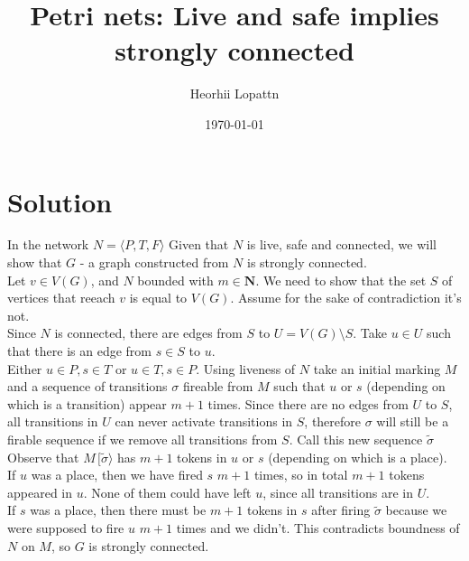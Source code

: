 \documentclass[12pt]{article}
\title{Petri nets: Live and safe implies strongly connected}
\author{Heorhii Lopattn}
\date{\today}
\begin{document}
\newcommand{\fire}[1]{\xrightarrow{#1}}
\newcommand{\fireb}[1]{\xleftarrow{#1}}

\newcommand{\firee}[1]{\,[#1\rangle}

\maketitle

\section*{Solution}
In the network $N = \langle P, T, F \rangle$ Given that $N$ is live, safe and connected, we will show that $G$ - a graph constructed from $N$ is strongly connected. \\
Let $v \in V(G)$, and $N$ bounded with $m \in \mathbf{N}$. We need to show that the set $S$ of vertices that reeach $v$ is equal to $V(G)$. Assume for the sake of contradiction it's not. \\ 
Since $N$ is connected, there are edges from $S$ to $U=V(G)\setminus S$. Take $u \in U$ such that there is an edge from $s \in S$ to $u$. \\
Either $u \in P, s \in T$ or $u \in T, s \in P$. Using liveness of $N$ take an initial marking $M$ and a sequence of transitions $\sigma$ fireable from $M$ such that $u$ or $s$ (depending on which is a transition) appear $m+1$ times. 
Since there are no edges from $U$ to $S$, all transitions in $U$ can never activate transitions in $S$, therefore $\sigma$ will still be a firable sequence if we remove all transitions from $S$. Call this new sequence $\tilde \sigma$ \\ 
Observe that $M \firee {\tilde \sigma} $ has $m+1$ tokens in $u$ or $s$ (depending on which is a place).\\
If $u$ was a place, then we have fired $s$ $m+1$ times, so in total $m+1$ tokens appeared in $u$. None of them could have left $u$, since all transitions are in $U$.\\
If $s$ was a place, then there must be $m+1$ tokens in $s$ after firing $\tilde \sigma$ because we were supposed to fire $u$ $m+1$ times and we didn't.
This contradicts boundness of $N$ on $M$, so $G$ is strongly connected.
\end{document}

